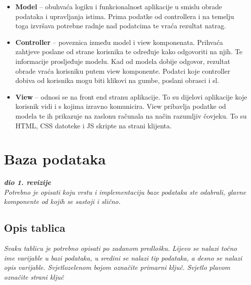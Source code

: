 \begin{itemize}
\item \textbf{Model} – obuhvaća logiku i funkcionalnost aplikacije u smislu obrade podataka i upravljanja istima. Prima podatke od controllera i na temelju toga izvršava potrebne radnje nad podatcima te vraća rezultat natrag.

\item \textbf{Controller} – poveznica između model i view komponenata. Prihvaća zahtjeve poslane od strane korisnika te određuje kako odgovoriti na njih. Te informacije prosljeđuje modelu. Kad od modela dobije odgovor, rezultat obrade vraća korisniku putem view komponente. Podatci koje controller dobiva od korisnika mogu biti klikovi na gumbe, poslani obrasci i sl.

\item \textbf{View} – odnosi se na front end stranu aplikacije. To su dijelovi aplikacije koje korisnik vidi i s kojima izravno komunicira. View pribavlja podatke od modela te ih prikazuje na zaslonu računala na način razumljiv čovjeku. To su HTML, CSS datoteke i JS skripte na strani klijenta. 
\end{itemize}		
				
		\section{Baza podataka}
			
			\textbf{\textit{dio 1. revizije}}\\
			
		\textit{Potrebno je opisati koju vrstu i implementaciju baze podataka ste odabrali, glavne komponente od kojih se sastoji i slično.}
		
			\subsection{Opis tablica}
			

				\textit{Svaku tablicu je potrebno opisati po zadanom predlošku. Lijevo se nalazi točno ime varijable u bazi podataka, u sredini se nalazi tip podataka, a desno se nalazi opis varijable. Svjetlozelenom bojom označite primarni ključ. Svjetlo plavom označite strani ključ}
				
